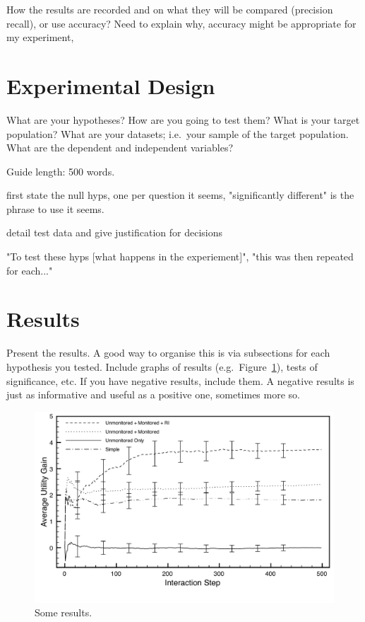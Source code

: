 \documentclass{csfourzero}
\begin{document}
How the results are recorded and on what they will be compared (precision recall), or use accuracy? Need to explain why, accuracy might be appropriate for my experiment,

\section{Experimental Design}
\label{sec:exp}

What are your hypotheses? How are you going to test them? What is your
target population? What are your datasets; i.e.\ your sample of the
target population. What are the dependent and independent variables?

Guide length: 500 words.

first state the null hyps, one per question it seems, "significantly different" is the phrase to use it seems.

detail test data and give justification for decisions

"To test these hyps [what happens in the experiement]", "this was then repeated for each..."

\section{Results}
\label{sec:results}

Present the results. A good way to organise this is via subsections
for each hypothesis you tested. Include graphs of results
(e.g.\ Figure~\ref{fig:data}), tests of significance, etc. If you have
negative results, include them. A negative results is just as
informative and useful as a positive one, sometimes more so.

\begin{figure}
\centerline{\includegraphics[width=5in]{basic-data-errors}}
\caption{Some results.}\label{fig:data}
\end{figure}
\end{document}

